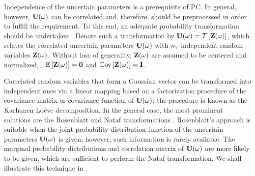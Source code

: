 Independence of the uncertain parameters is a prerequisite of PC.
In general, however, $\mathbf{U}(\omega)$ can be correlated and, therefore, should be preprocessed in order to fulfill the requirement.
To this end, an adequate probability transformation should be undertaken \cite{eldred2009}.
Denote such a transformation by $\vU(\o) = \oTransform{\vZ(\o)}$, which relates the correlated uncertain parameters $\mathbf{U}(\omega)$ with ${n_\text{v}}$ independent random variables $\mathbf{Z}(\omega)$.
Without loss of generality, $\mathbf{Z}(\omega)$ are assumed to be centered and normalized, \ie, $\oExp{\vZ(\o)} = \mZero$ and $\oCov{\vZ(\o)} = \mI$.

Correlated random variables that form a Gaussian vector can be transformed into independent ones via a linear mapping based on a factorization procedure of the covariance matrix or covariance function of $\mathbf{U}(\omega)$; the procedure is known as the Karhunen-Lo\`{e}ve decomposition.
In the general case, the most prominent solutions are the Rosenblatt \cite{rosenblatt1952} and Nataf transformations \cite{li2008}.
Rosenblatt's approach is suitable when the joint probability distribution function of the uncertain parameters $\mathbf{U}(\omega)$ is given; however, such information is rarely available.
The marginal probability distributions and correlation matrix of $\mathbf{U}(\omega)$ are more likely to be given, which are sufficient to perform the Nataf transformation.
We shall illustrate this technique in .
